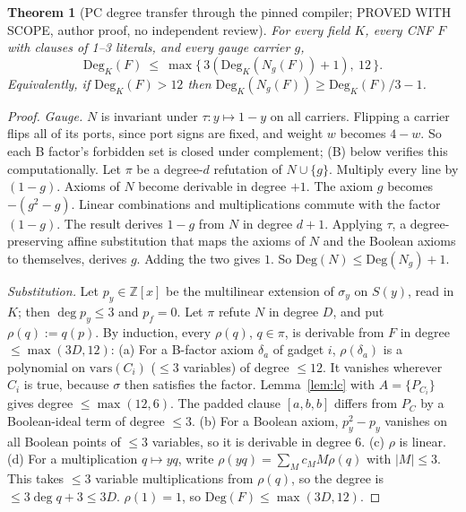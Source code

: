 \documentclass[11pt]{article}
\newtheorem{theorem}{Theorem}
\theoremstyle{definition}
\newcommand{\Deg}{\mathrm{Deg}}
\begin{document}
\begin{theorem}[PC degree transfer through the pinned compiler; PROVED WITH SCOPE, author proof, no independent review]\label{thm:deg}
For every field $K$, every CNF $F$ with clauses of 1--3 literals, and every gauge carrier $g$,
\[\Deg_K(F)\ \le\ \max\{\,3(\Deg_K(N_g(F))+1),\ 12\,\}.\]
Equivalently, if $\Deg_K(F)>12$ then $\Deg_K(N_g(F))\ge\Deg_K(F)/3-1$.
\end{theorem}
\begin{proof}
\emph{Gauge.} $N$ is invariant under $\tau:y\mapsto1-y$ on all carriers. Flipping a carrier flips all of its ports, since port signs are fixed, and weight $w$ becomes $4-w$. So each B factor's forbidden set is closed under complement; (B) below verifies this computationally. Let $\pi$ be a degree-$d$ refutation of $N\cup\{g\}$. Multiply every line by $(1-g)$. Axioms of $N$ become derivable in degree $+1$. The axiom $g$ becomes $-(g^2-g)$. Linear combinations and multiplications commute with the factor $(1-g)$. The result derives $1-g$ from $N$ in degree $d+1$. Applying $\tau$, a degree-preserving affine substitution that maps the axioms of $N$ and the Boolean axioms to themselves, derives $g$. Adding the two gives $1$. So $\Deg(N)\le\Deg(N_g)+1$.

\emph{Substitution.} Let $p_y\in\mathbb Z[x]$ be the multilinear extension of $\sigma_y$ on $S(y)$, read in $K$; then $\deg p_y\le3$ and $p_f=0$. Let $\pi$ refute $N$ in degree $D$, and put $\rho(q):=q(p)$. By induction, every $\rho(q)$, $q\in\pi$, is derivable from $F$ in degree $\le\max(3D,12)$:
(a) For a B-factor axiom $\delta_a$ of gadget $i$, $\rho(\delta_a)$ is a polynomial on $\mathrm{vars}(C_i)$ ($\le3$ variables) of degree $\le12$. It vanishes wherever $C_i$ is true, because $\sigma$ then satisfies the factor. Lemma~\ref{lem:lc} with $A=\{P_{C_i}\}$ gives degree $\le\max(12,6)$. The padded clause $[a,b,b]$ differs from $P_C$ by a Boolean-ideal term of degree $\le3$.
(b) For a Boolean axiom, $p_y^2-p_y$ vanishes on all Boolean points of $\le3$ variables, so it is derivable in degree $6$.
(c) $\rho$ is linear.
(d) For a multiplication $q\mapsto yq$, write $\rho(yq)=\sum_M c_M M\rho(q)$ with $|M|\le3$. This takes $\le3$ variable multiplications from $\rho(q)$, so the degree is $\le3\deg q+3\le3D$.
$\rho(1)=1$, so $\Deg(F)\le\max(3D,12)$.
\end{proof}
\end{document}
